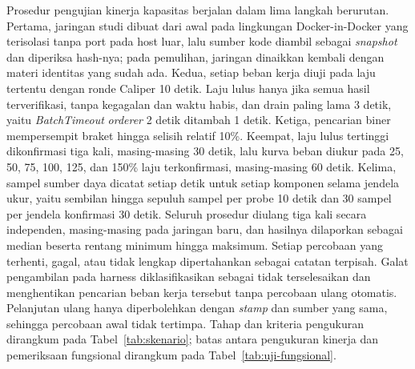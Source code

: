 Prosedur pengujian kinerja kapasitas berjalan dalam lima langkah berurutan. Pertama, jaringan studi dibuat dari awal pada lingkungan Docker-in-Docker yang terisolasi tanpa port pada host luar, lalu sumber kode diambil sebagai \textit{snapshot} dan diperiksa hash-nya; pada pemulihan, jaringan dinaikkan kembali dengan materi identitas yang sudah ada. Kedua, setiap beban kerja diuji pada laju tertentu dengan ronde Caliper 10 detik. Laju lulus hanya jika semua hasil terverifikasi, tanpa kegagalan dan waktu habis, dan drain paling lama 3 detik, yaitu \textit{BatchTimeout} \textit{orderer} 2 detik ditambah 1 detik. Ketiga, pencarian biner mempersempit braket hingga selisih relatif 10\%. Keempat, laju lulus tertinggi dikonfirmasi tiga kali, masing-masing 30 detik, lalu kurva beban diukur pada 25, 50, 75, 100, 125, dan 150\% laju terkonfirmasi, masing-masing 60 detik. Kelima, sampel sumber daya dicatat setiap detik untuk setiap komponen selama jendela ukur, yaitu sembilan hingga sepuluh sampel per probe 10 detik dan 30 sampel per jendela konfirmasi 30 detik. Seluruh prosedur diulang tiga kali secara independen, masing-masing pada jaringan baru, dan hasilnya dilaporkan sebagai median beserta rentang minimum hingga maksimum. Setiap percobaan yang terhenti, gagal, atau tidak lengkap dipertahankan sebagai catatan terpisah. Galat pengambilan pada harness diklasifikasikan sebagai tidak terselesaikan dan menghentikan pencarian beban kerja tersebut tanpa percobaan ulang otomatis. Pelanjutan ulang hanya diperbolehkan dengan \textit{stamp} dan sumber yang sama, sehingga percobaan awal tidak tertimpa. Tahap dan kriteria pengukuran dirangkum pada Tabel~\ref{tab:skenario}; batas antara pengukuran kinerja dan pemeriksaan fungsional dirangkum pada Tabel~\ref{tab:uji-fungsional}.

